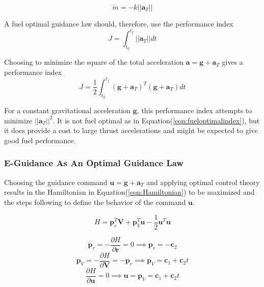\begin{equation}
\label{eqn:fuel_rate}
\dot{m} = -k ||\bm{a}_T||
\end{equation}

A fuel optimal guidance law should, therefore, use the performance index
\begin{equation}
\label{eqn:fueloptimalindex}
J = \int_{t_0}^{t_f} ||\bm{a}_T||dt
\end{equation}

Choosing to minimize the square of the total acceleration $\bm{a} = \bm{g} + \bm{a}_T$ gives a performance index
\begin{equation}
\label{eqn:performanceindex}
J = \frac{1}{2} \int_{t_0}^{t_f} (\bm{g}+\bm{a}_T)^T(\bm{g}+\bm{a}_T)dt
\end{equation}

For a constant gravitational acceleration $\bm{g}$, this performance index attempts to minimize $||\bm{a}_T||^2$. It is not fuel optimal as in Equation\:(\ref{eqn:fueloptimalindex}), but it does provide a cost to large thrust accelerations and might be expected to give good fuel performance.

\subsubsection{E-Guidance As An Optimal Guidance Law}
Choosing the guidance command $\bm{u} = \bm{g} + \bm{a}_T$ and applying optimal control theory results in the Hamiltonian in Equation\:(\ref{eqn:Hamiltonian}) to be maximized and the steps following to define the behavior of the command $\bm{u}$.

\begin{equation}
\label{eqn:Hamiltonian}
H = \bm{p}_r^T\bm{V} + \bm{p}_V^T\bm{u} - \frac{1}{2}\bm{u}^T\bm{u}
\end{equation}

\begin{equation*}
\dot{\bm{p}}_r = -\frac{\partial H}{\partial \bm{r}} = 0 \implies \bm{p}_r = -\bm{c}_2
\end{equation*}
\begin{equation*}
\dot{\bm{p}}_V = -\frac{\partial H}{\partial \bm{V}} = -\bm{p}_r \implies \bm{p}_V = \bm{c}_1 + \bm{c}_2 t
\end{equation*}
\begin{equation*}
\frac{\partial H}{\partial \bm{u}} = 0 \implies \bm{u} = \bm{p}_V = \bm{c}_1 + \bm{c}_2 t
\end{equation*}

